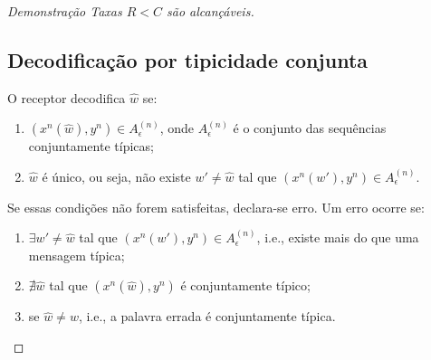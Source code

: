 \begin{proof}[Demonstração Taxas $R < C$ são alcançáveis]
\subsection*{Decodificação por tipicidade conjunta}
O receptor decodifica $\hat{w}$ se:
\begin{enumerate}
    \item $(x^n(\hat{w}), y^n) \in A_{\epsilon}^{(n)}$, onde $A_{\epsilon}^{(n)}$ é o conjunto das sequências conjuntamente típicas;
    \item $\hat{w}$ é único, ou seja, não existe $w' \neq \hat{w}$ tal que $(x^n(w'), y^n) \in A_{\epsilon}^{(n)}$.
\end{enumerate}
Se essas condições não forem satisfeitas, declara-se erro. %
Um erro ocorre se:
\begin{enumerate}
  \item  $\exists w' \neq \hat{w}$ tal que $\left( x^n(w'), y^n \right) \in A_{\epsilon}^{(n)}$, i.e., 
	existe mais do que uma mensagem típica;
  \item $\nexists \hat{w}$ tal que $\left( x^n(\hat{w}), y^n \right)$ é conjuntamente típico;
  \item se $\hat{w} \neq w$, i.e., a palavra errada é conjuntamente típica.
\end{enumerate}


\end{proof}
